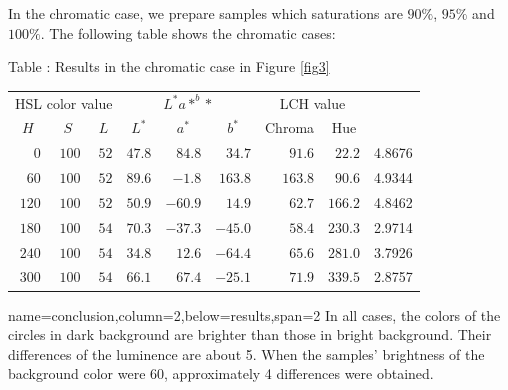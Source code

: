 \documentclass[portrait,final,a0paper]{baposter}
\begin{document}
\begin{poster}
{ In the chromatic case, we prepare samples which saturations are $90\%$,
 $95\%$ and $100\%$.
The following table shows the chromatic cases:
    \begin{center}
Table : Results in the chromatic case in
   Figure \ref{fig3}\\
	\begin{tabular}[t]{|*{9}{r|}}\hline
	 \multicolumn{3}{|c|}{HSL color value}&
	 \multicolumn{3}{c|}{$L^*a*^b*$}&
	 \multicolumn{2}{c|}{LCH value}&\\\cline{1-8}
\multicolumn{1}{|c|}{$H$} &
\multicolumn{1}{c|}{$S$} &
\multicolumn{1}{c|}{$L$} &
\multicolumn{1}{|c|}{$L^*$} &
\multicolumn{1}{c|}{$a^*$} &
\multicolumn{1}{c|}{$b^*$}&
\multicolumn{1}{c|}{\small Chroma}&
	 \multicolumn{1}{c|}{Hue}&
	 \multicolumn{1}{|c|}{\smash{\raisebox{0.5em}{$dE$}}}
			\\\hline
    $0$&$100$ &$52$ &$47.8$ &$	84.8$ &  $34.7$ & $91.6$&$22.2$&4.8676\\\hline
  $60$&$100$ &$52$ &$89.6$ & $-1.8$ & $163.8$ &$163.8$ &$90.6$&4.9344\\\hline
 $120$&$100$ &$52$ &$50.9$ &$-60.9$ & $14.9$ &$62.7$ &$166.2$&4.8462\\\hline
	 $180$&$100$ &$54$ &$70.3$ &$-37.3$&$-45.0$ &$58.4$ &$230.3$&2.9714\\\hline
$240$&$100$ &$54$ &$34.8$ &$12.6$ & $-64.4$ &$65.6$ &$281.0$&3.7926\\\hline
  $300$&$100$ &$54$ &$66.1$ &$67.4$ &$-25.1$ &$71.9$ &$339.5$&2.8757\\\hline
	\end{tabular}
	 \end{center}
}
 {name=conclusion,column=2,below=results,span=2}
{In all cases, the  colors of the circles in dark background are
 brighter than those in bright background. Their differences of the
 luminence are about 5. When the samples' brightness of the background
 color were 
 60, approximately 4 differences were obtained.}
\end{poster}
\end{document}
